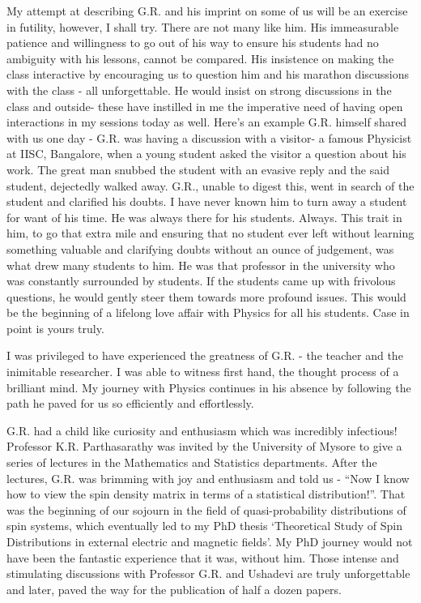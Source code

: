 My attempt at describing G.R. and his imprint on some of us will be an exercise in
futility, however, I shall try. There are not many like him. His immeasurable patience
and willingness to go out of his way to ensure his students had no ambiguity with his
lessons, cannot be compared. His insistence on making the class interactive by encouraging us to question him and his marathon discussions with the class - all unforgettable.
He would insist on strong discussions in the class and outside- these have instilled in
me the imperative need of having open interactions in my sessions today as well. Here’s
an example G.R. himself shared with us one day - G.R. was having a discussion with a
visitor- a famous Physicist at IISC, Bangalore, when a young student asked the visitor a
question about his work. The great man snubbed the student with an evasive reply and
the said student, dejectedly walked away. G.R., unable to digest this, went in search of
the student and clarified his doubts. I have never known him to turn away a student
for want of his time. He was always there for his students. Always. This trait in him,
to go that extra mile and ensuring that no student ever left without learning something
valuable and clarifying doubts without an ounce of judgement, was what drew many
students to him. He was that professor in the university who was constantly surrounded
by students. If the students came up with frivolous questions, he would gently steer
them towards more profound issues. This would be the beginning of a lifelong love affair
with Physics for all his students. Case in point is yours truly.


I was privileged to have experienced the greatness of G.R. - the teacher and the inimitable researcher. I was able to witness first hand, the thought process of a brilliant
mind. My journey with Physics continues in his absence by following the path he paved
for us so efficiently and effortlessly.

G.R. had a child like curiosity and enthusiasm which was incredibly infectious! Professor K.R. Parthasarathy was invited by the University of Mysore to give a series of
lectures in the Mathematics and Statistics departments. After the lectures, G.R. was
brimming with joy and enthusiasm and told us - “Now I know how to view the spin
density matrix in terms of a statistical distribution!”. That was the beginning of our
sojourn in the field of quasi-probability distributions of spin systems, which eventually
led to my PhD thesis `Theoretical Study of Spin Distributions in external electric and
magnetic fields'. My PhD journey would not have been the fantastic experience that it
was, without him. Those intense and stimulating discussions with Professor G.R. and
Ushadevi are truly unforgettable and later, paved the way for the publication of half a
dozen papers.


